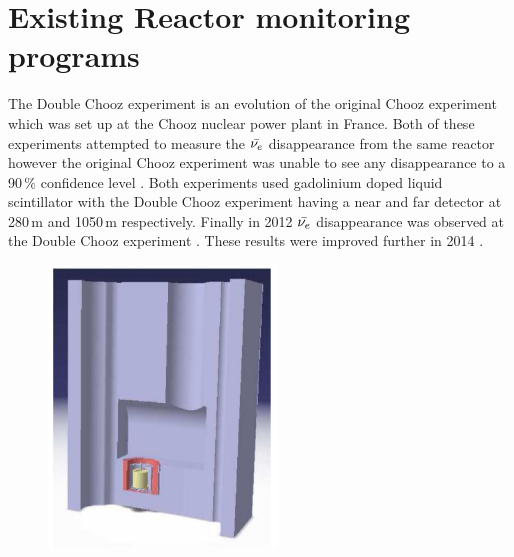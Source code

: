 \section{Existing Reactor monitoring programs}\label{sec:exisitingReactorMonitoringPrograms}
The Double Chooz experiment is an evolution of the original Chooz experiment which was set up at the Chooz nuclear power plant in France\cite{lasserre2006}. Both of these experiments attempted to measure the $\Bar{\nu_e}$ disappearance from the same reactor however the original Chooz experiment was unable to see any disappearance to a 90$\,\%$ confidence level \cite{Apollonio_2003}. Both experiments used gadolinium doped liquid scintillator with the Double Chooz experiment having a near and far detector at 280\,m and 1050\,m respectively\cite{lasserre2006}. Finally in 2012 $\Bar{\nu_e}$ disappearance was observed at the Double Chooz experiment \cite{Abe_2012}. These results were improved further in 2014 \cite{abe2014improved}.
\begin{figure}[htbp]
 \centering
 \includegraphics[height=75mm]{Chapter2/Figs/Raster/DCNearDetector.png} %
 \label{DoubleChoozNearDetector}
\end{figure}
